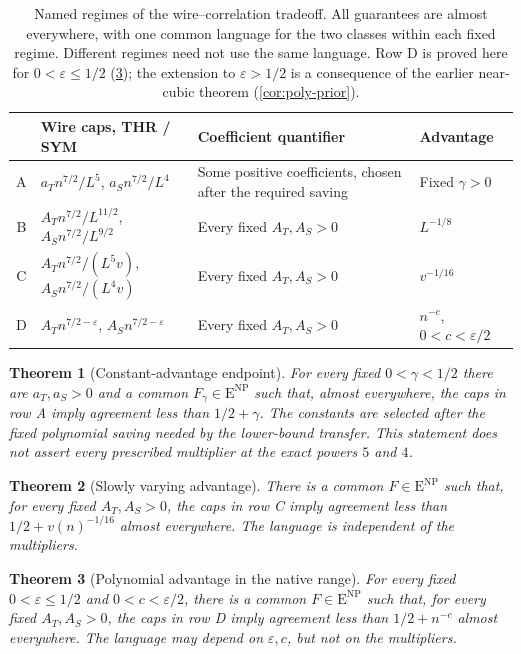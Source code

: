 \documentclass[11pt,letterpaper]{article}
\newtheorem{theorem}{Theorem}[section]
\theoremstyle{definition}
\theoremstyle{remark}
\newcommand{\ENP}{\mathrm{E}^{\mathrm{NP}}}
\begin{document}
\begin{table}[ht]
\centering
\begin{tabular}{@{}c p{} p{} p{}@{}}
\toprule
 & Wire caps, THR / SYM & Coefficient quantifier & Advantage\\
\midrule
A & $a_T n^{7/2}/L^5$, $a_S n^{7/2}/L^4$
  & Some positive coefficients, chosen after the required saving
  & Fixed $\gamma>0$\\[3pt]
B & $A_T n^{7/2}/L^{11/2}$, $A_S n^{7/2}/L^{9/2}$
  & Every fixed $A_T,A_S>0$ & $L^{-1/8}$\\[3pt]
C & $A_T n^{7/2}/(L^5v)$, $A_S n^{7/2}/(L^4v)$
  & Every fixed $A_T,A_S>0$ & $v^{-1/16}$\\[3pt]
D & $A_T n^{7/2-\varepsilon}$, $A_S n^{7/2-\varepsilon}$
  & Every fixed $A_T,A_S>0$ & $n^{-c}$, $0<c<\varepsilon/2$\\
\bottomrule
\end{tabular}
\caption{Named regimes of the wire--correlation tradeoff. All guarantees
are almost everywhere, with one common language for the two classes
within each fixed regime. Different regimes need not use the same language.
Row D is proved here for $0<\varepsilon\le1/2$
(\cref{thm:poly}); the extension to $\varepsilon>1/2$ is a consequence
of the earlier near-cubic theorem (\cref{cor:poly-prior}).}
\label{tab:regimes}
\end{table}

\begin{theorem}[Constant-advantage endpoint]
\label{thm:endpoint}
For every fixed $0<\gamma<1/2$ there are $a_T,a_S>0$ and a common
$F_\gamma\in\ENP$ such that, almost everywhere, the caps in row A
imply agreement less than $1/2+\gamma$. The constants are selected after
the fixed polynomial saving needed by the lower-bound transfer.
This statement does not assert every prescribed multiplier at the exact
powers $5$ and $4$.
\end{theorem}

\begin{theorem}[Slowly varying advantage]
\label{thm:slow}
There is a common $F\in\ENP$ such that, for every fixed $A_T,A_S>0$,
the caps in row C imply agreement less than $1/2+v(n)^{-1/16}$ almost
everywhere. The language is independent of the multipliers.
\end{theorem}

\begin{theorem}[Polynomial advantage in the native range]
\label{thm:poly}
For every fixed $0<\varepsilon\le1/2$ and $0<c<\varepsilon/2$, there is a
common $F\in\ENP$ such that, for every fixed $A_T,A_S>0$, the caps
in row D imply agreement less than $1/2+n^{-c}$ almost everywhere.
The language may depend on $\varepsilon,c$, but not on the multipliers.
\end{theorem}
\end{document}
